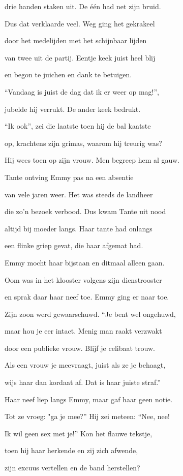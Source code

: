 drie handen staken uit.
De één had net zijn bruid.

Dus dat verklaarde veel.
Weg ging het gekrakeel

door het medelijden
met het schijnbaar lijden

van twee uit de partij.
Eentje keek juist heel blij

en begon te juichen
en dank te betuigen.

“Vandaag is juist de dag
dat ik er weer op mag!”,

jubelde hij verrukt.
De ander keek bedrukt.

“Ik ook”, zei die laatste
toen hij de bal kaatste

op, krachtens zijn grimas,
waarom hij treurig was?

Hij wees toen op zijn vrouw.
Men begreep hem al gauw.

Tante ontving Emmy
pas na een absentie

van vele jaren weer.
Het was steeds de landheer

die zo’n bezoek verbood.
Dus kwam Tante uit nood

altijd bij moeder langs.
Haar tante had onlangs

een flinke griep gevat,
die haar afgemat had.

Emmy mocht haar bijstaan
en ditmaal alleen gaan.

Oom was in het klooster
volgens zijn dienstrooster

en sprak daar haar neef toe.
Emmy ging er naar toe.

Zijn zoon werd gewaarschuwd.
“Je bent wel ongehuwd,

maar hou je eer intact.
Menig man raakt verzwakt

door een publieke vrouw.
Blijf je celibaat trouw.

Als een vrouw je meevraagt,
juist als ze je behaagt,

wijs haar dan kordaat af.
Dat is haar juiste straf.”

Haar neef liep langs Emmy,
maar gaf haar geen notie.

Tot ze vroeg: "ga je mee?”
Hij zei meteen: “Nee, nee!

Ik wil geen sex met je!”
Kon het flauwe tekstje,

toen hij haar herkende
en zij zich afwende,

zijn excuus vertellen
en de band herstellen?
